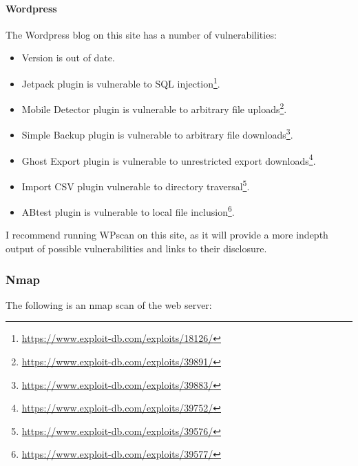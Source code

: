 				\paragraph{Wordpress}
					The Wordpress blog on this site has a number of vulnerabilities:
						\begin{itemize}
							\item Version is out of date.
							\item Jetpack plugin is vulnerable to SQL injection\footnote{\url{https://www.exploit-db.com/exploits/18126/}}.
							\item Mobile Detector plugin is vulnerable to arbitrary file uploads\footnote{\url{https://www.exploit-db.com/exploits/39891/}}.
							\item Simple Backup plugin is vulnerable to arbitrary file downloads\footnote{\url{https://www.exploit-db.com/exploits/39883/}}.
							\item Ghost Export plugin is vulnerable to unrestricted export downloads\footnote{\url{https://www.exploit-db.com/exploits/39752/}}.
							\item Import CSV plugin vulnerable to directory traversal\footnote{\url{https://www.exploit-db.com/exploits/39576/}}.
							\item ABtest plugin is vulnerable to local file inclusion\footnote{\url{https://www.exploit-db.com/exploits/39577/}}.
						\end{itemize}
						I recommend running WPscan on this site, as it will provide a more indepth output of possible vulnerabilities and links to their disclosure. 

					
			\subsubsection{Nmap}
				The following is an nmap scan of the web server:
				



			
